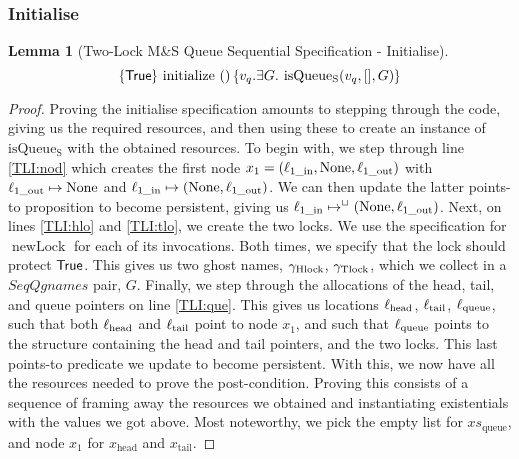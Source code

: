 \documentclass[a4paper, 10pt]{report}
\theoremstyle{definition}
\newtheorem{lemma}[theorem]{Lemma}
\newcommand{\newLock}{\operatorname{newLock}}
\newcommand{\initialise}{\operatorname{initialize}}
\newcommand{\msq}{M\&S Queue}
\newcommand{\tlmsq}{Two-Lock \msq{}}
\newcommand{\isqueueseq}{\operatorname{isQueue_{S}}}
\newcommand{\SeqQgnames}{SeqQgnames}
\newcommand{\vq}{v_q}
\newcommand{\xsqueue}{xs_{\mathrm{queue}}}
\newcommand{\locinM}[1]{\loc_{#1\_\mathrm{in}}}
\newcommand{\locoutM}[1]{\loc_{#1\_\mathrm{out}}}
\newcommand{\locN}[1]{\loc_{\mathrm{#1}}}
\newcommand{\lochead}{\locN{head}}
\newcommand{\loctail}{\locN{tail}}
\newcommand{\locqueue}{\locN{queue}}
\newcommand{\node}{x}
\newcommand{\nodeM}[1]{\node_{#1}}
\newcommand{\nodeN}[1]{\node_{\mathrm{#1}}}
\newcommand{\nodehead}{\nodeN{head}}
\newcommand{\nodetail}{\nodeN{tail}}
\newcommand{\Qg}{G}
\newcommand{\ghlock}{\gname_{\mathrm{Hlock}}}
\newcommand{\gtlock}{\gname_{\mathrm{Tlock}}}
\newcommand{\seqspecinitHTGen}[2]{\hoare{\TRUE}{\initialise \ \TT}{#1 . \Exists #2. \isqueueseq(#1, [], #2)}}
\newcommand{\seqspecinitGen}[2]{\seqspecinitHTGen{#1}{#2}}
\newcommand{\seqspecinit}{\seqspecinitGen{\vq}{\Qg}}
\begin{document}
\subsubsection{Initialise}
\begin{lemma}[\tlmsq{} Sequential Specification - Initialise]\label{TLMSQ:spec:seq:init}
  \begin{equation*}
    \seqspecinit
  \end{equation*}
\end{lemma}
\begin{proof}
Proving the initialise specification amounts to stepping through the code, giving us the required resources, and then using these to create an instance of $\isqueueseq$ with the obtained resources. To begin with, we step through line \ref{TLI:nod} which creates the first node $\nodeM{1} = (\locinM{1}, \None, \locoutM{1})$ with $\locoutM{1} \mapsto \None$ and $\locinM{1} \mapsto (\None, \locoutM{1})$. We can then update the latter points-to proposition to become persistent, giving us $\locinM{1} \mapsto^{\persistently} (\None, \locoutM{1})$. Next, on lines \ref{TLI:hlo} and \ref{TLI:tlo}, we create the two locks. We use the specification for $\newLock$ for each of its invocations. Both times, we specify that the lock should protect $\textsf{True}$. This gives us two ghost names, $\ghlock$, $\gtlock$, which we collect in a $\SeqQgnames$ pair, $\Qg$.
Finally, we step through the allocations of the head, tail, and queue pointers on line \ref{TLI:que}. This gives us locations $\lochead$, $\loctail$, $\locqueue$, such that both $\lochead$ and $\loctail$ point to node $\nodeM{1}$, and such that $\locqueue$ points to the structure containing the head and tail pointers, and the two locks. This last points-to predicate we update to become persistent.
With this, we now have all the resources needed to prove the post-condition. Proving this consists of a sequence of framing away the resources we obtained and instantiating existentials with the values we got above. Most noteworthy, we pick the empty list for $\xsqueue$, and node $\nodeM{1}$ for $\nodehead$ and $\nodetail$.
\end{proof}
\end{document}
